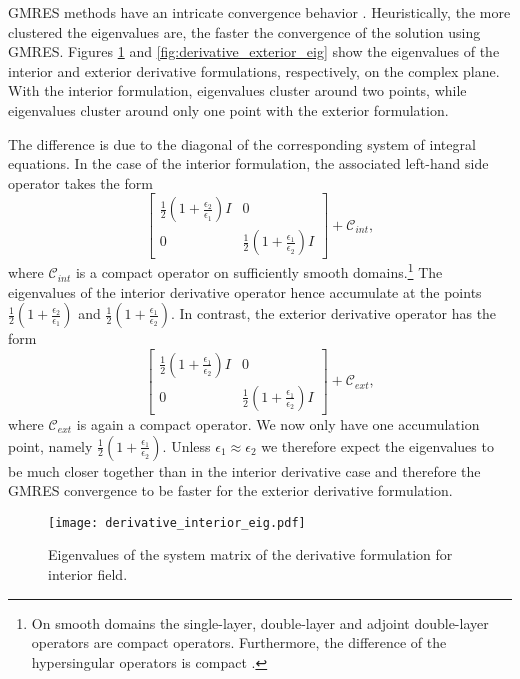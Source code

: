 GMRES methods have an intricate convergence behavior \cite{mark1999a}.
Heuristically, the more clustered the eigenvalues are, the faster the convergence of the solution using GMRES.
Figures \ref{fig:derivative_interior_eig} and \ref{fig:derivative_exterior_eig} show the eigenvalues of the interior and exterior derivative formulations, respectively, on the complex plane.
With the interior formulation, eigenvalues cluster around two points, while eigenvalues cluster around only one point with the exterior formulation.

The difference is due to the diagonal of the corresponding system of integral equations.
In the case of the interior formulation, the associated left-hand side operator takes the form
$$
\begin{bmatrix}\frac{1}{2}(1 + \frac{\epsilon_2}{\epsilon_1})I & 0 \\ 0 & \frac{1}{2}(1 + \frac{\epsilon_1}{\epsilon_2})I
\end{bmatrix} + \mathcal{C}_{int},
$$
where $\mathcal{C}_{int}$ is a compact operator on sufficiently smooth domains.\footnote{On smooth domains the single-layer, double-layer and adjoint double-layer operators are compact operators.
Furthermore, the difference of the hypersingular operators is compact \cite{Hiptmair2006-om}.}
The eigenvalues of the interior derivative operator hence accumulate at the points $\frac{1}{2}(1 + \frac{\epsilon_2}{\epsilon_1})$ and $\frac{1}{2}(1 + \frac{\epsilon_1}{\epsilon_2})$.
In contrast, the exterior derivative operator has the form
$$
\begin{bmatrix}\frac{1}{2}(1 + \frac{\epsilon_1}{\epsilon_2})I & 0 \\ 0 & \frac{1}{2}(1 + \frac{\epsilon_1}{\epsilon_2})I
\end{bmatrix} + \mathcal{C}_{ext},
$$
where $\mathcal{C}_{ext}$ is again a compact operator.
We now only have one accumulation point, namely $\frac{1}{2}(1 + \frac{\epsilon_1}{\epsilon_2})$.
Unless $\epsilon_1\approx \epsilon_2$ we therefore expect the eigenvalues to be much closer together than in the interior derivative case and therefore the GMRES convergence to be faster for the exterior derivative formulation.

\begin{figure}%
    \centering
    \texttt{[image: derivative\_interior\_eig.pdf]}
    \caption{Eigenvalues of the system matrix of the derivative formulation for interior field.}
    \label{fig:derivative_interior_eig}
\end{figure}

